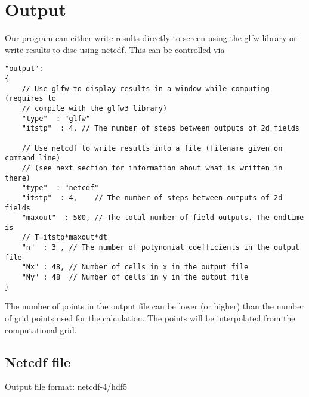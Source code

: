 \section{Output}
Our program can either write results directly to screen using the glfw library
or write results to disc using netcdf.
This can be controlled via
\begin{verbatim}
"output":
{
    // Use glfw to display results in a window while computing (requires to
    // compile with the glfw3 library)
    "type"  : "glfw"
    "itstp"  : 4, // The number of steps between outputs of 2d fields

    // Use netcdf to write results into a file (filename given on command line)
    // (see next section for information about what is written in there)
    "type"  : "netcdf"
    "itstp"  : 4,    // The number of steps between outputs of 2d fields
    "maxout"  : 500, // The total number of field outputs. The endtime is
    // T=itstp*maxout*dt
    "n"  : 3 , // The number of polynomial coefficients in the output file
    "Nx" : 48, // Number of cells in x in the output file
    "Ny" : 48  // Number of cells in y in the output file
}
\end{verbatim}
The number of points in the output file can be lower (or higher) than the number of
grid points used for the calculation. The points will be interpolated from the
computational grid.
\subsection{Netcdf file}
Output file format: netcdf-4/hdf5

